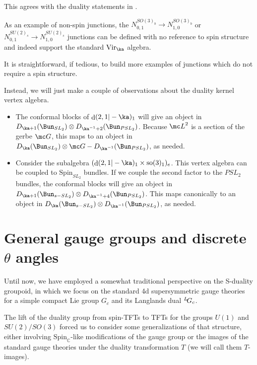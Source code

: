 \documentclass[11pt,reqno]{amsart}
\theoremstyle{plain}
\numberwithin{equation}{section}
\newcommand{\C}{\mathbb{C}}
\def\neg{\negthinspace}
\def\LG{{}^L\neg G}
\DeclareMathOperator{\Vir}{Vir}
\DeclareMathOperator{\td}{d}
\DeclareMathOperator{\tso}{so}
\theoremstyle{definition}
\begin{document}
\medskip

This agrees with the duality statements in \cite{FW2}.

As an example of non-spin junctions, the $N^{SO(3)_b}_{0,1} \to
N^{SO(3)_b}_{1,0}$ or $N^{SU(2)_s}_{0,1} \to N^{SU(2)_s}_{1,0}$
junctions can be defined with no reference to spin structure and
indeed support the standard $\Vir_\ka$ algebra.

It is straightforward, if tedious, to build more examples of junctions
which do not require a spin structure.

Instead, we will just make a couple of observations about the duality
kernel vertex algebra.

\medskip

\begin{itemize}
\item The conformal blocks of $\td(2,1|-\ka)_1$ will give an object in
  $D_{\ka+1}(\Bun_{SL_2}) \otimes D_{\ka^{-1}+2}(\Bun_{PSL_2})$.
Because ${\mc L}^2$ is a section of the gerbe ${\mc G}$, this maps to an object in $D_{\ka}(\Bun_{SL_2}) \otimes {\mc G}-D_{\ka^{-1}}(\Bun_{PSL_2})$,
as needed. 

\medskip

\item Consider the subalgebra $(\td(2,1|-\ka)_1 \times \tso(3)_1)_e$. This vertex algebra can be coupled to $\mathrm{Spin}_{SL_2}$ bundles. If we couple the second factor to the $PSL_2$ bundles, the conformal blocks will give an object in $D_{\ka+1}(\Bun_{s-SL_2}) \otimes D_{\ka^{-1}+4}(\Bun_{PSL_2})$.
This maps canonically to an object in $D_{\ka}(\Bun_{s-SL_2}) \otimes D_{\ka^{-1}}(\Bun_{PSL_2})$, as needed. 
\end{itemize}

\section{General gauge groups and discrete $\theta$ angles} \label{sec:topo}

Until now, we have employed a somewhat traditional perspective on the
S-duality groupoid, in which we focus on the standard 4d
supersymmetric gauge theories for a simple compact Lie group $G_c$
and its Langlands dual $\LG_c$.

The lift of the duality group from spin-TFTs to TFTs for the groups
$U(1)$ and $SU(2)/SO(3)$ forced us to consider some generalizations of
that structure, either involving $\mathrm{Spin}_{\C}$-like
modifications of the gauge group or the images of the standard gauge
theories under the duality transformation $T$ (we will call them
$T$-images).
\end{document}

